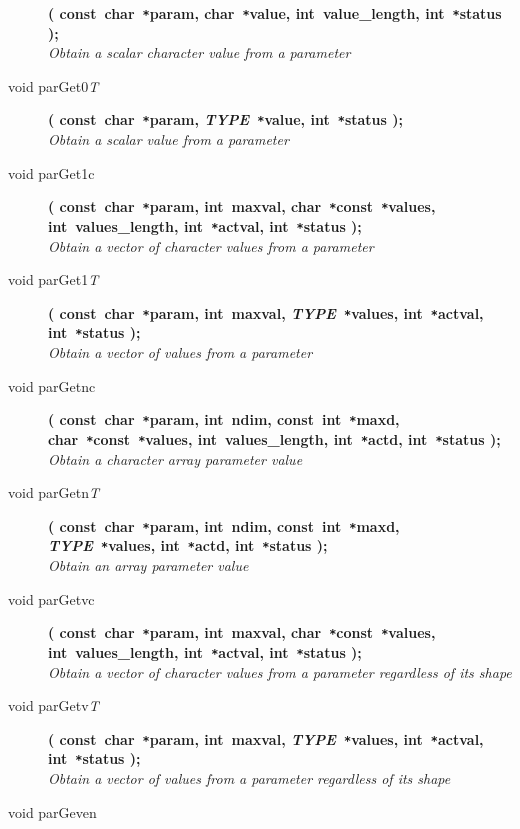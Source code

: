\documentclass[twoside,11pt]{article}
\begin{document}
\begin{flushleft}
\begin{description}
\textbf{( const~char~\texttt{*}param, char~\texttt{*}value,
          int~value\_length, int~\texttt{*}status );}\\
\textit{Obtain a scalar character value from a parameter}
\item[void parGet0\textit{T}]
\textbf{( const~char~\texttt{*}param, 
          \textit{TYPE}~\texttt{*}value, int~\texttt{*}status );}\\
\textit{Obtain a scalar value from a parameter}
\item[void parGet1c]
\textbf{( const~char~\texttt{*}param, int~maxval, 
               char~\texttt{*}const~\texttt{*}values, int~values\_length,
               int~\texttt{*}actval, int~\texttt{*}status );} \\
\textit{Obtain a vector of character values from a parameter}
\item[void parGet1\textit{T}]
\textbf{( const~char~\texttt{*}param, int~maxval, 
               \textit{TYPE}~\texttt{*}values, int~\texttt{*}actval,
               int~\texttt{*}status );} \\
\textit{Obtain a vector of values from a parameter}
\item[void parGetnc]
\textbf{( const~char~\texttt{*}param, int~ndim, const~int~\texttt{*}maxd, 
               char~\texttt{*}const~\texttt{*}values, int~values\_length,
               int~\texttt{*}actd, int~\texttt{*}status );} \\
\textit{Obtain a character array parameter value}
\item[void parGetn\textit{T}]
\textbf{( const~char~\texttt{*}param, int~ndim, const~int~\texttt{*}maxd,
               \textit{TYPE}~\texttt{*}values, int~\texttt{*}actd,
               int~\texttt{*}status );} \\
\textit{Obtain an array parameter value}
\item[void parGetvc]
\textbf{( const~char~\texttt{*}param, int~maxval, 
               char~\texttt{*}const~\texttt{*}values, int~values\_length,
               int~\texttt{*}actval, int~\texttt{*}status );} \\
\textit{Obtain a vector of character values from a parameter regardless of its
               shape}
\item[void parGetv\textit{T}]
\textbf{( const~char~\texttt{*}param, int~maxval, 
               \textit{TYPE}~\texttt{*}values, int~\texttt{*}actval,
               int~\texttt{*}status );} \\
\textit{Obtain a vector of values from a parameter regardless of its shape}
\item[void parGeven]

\end{description}
\end{flushleft}
\end{document}
